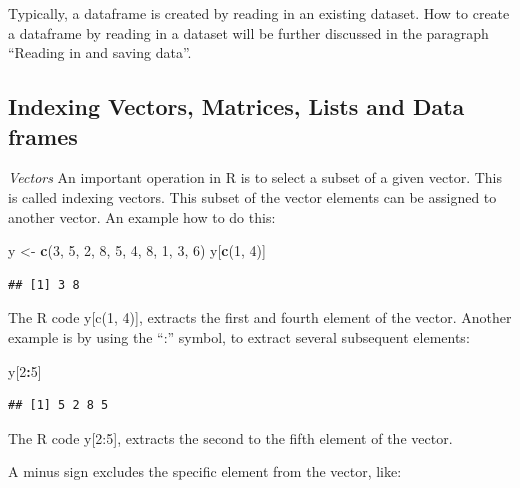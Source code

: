 \documentclass[]{book}
\newenvironment{Shaded}{\begin{snugshade}}{\end{snugshade}}
\newcommand{\KeywordTok}[1]{\textcolor[rgb]{0.13,0.29,0.53}{\textbf{#1}}}
\newcommand{\DecValTok}[1]{\textcolor[rgb]{0.00,0.00,0.81}{#1}}
\newcommand{\StringTok}[1]{\textcolor[rgb]{0.31,0.60,0.02}{#1}}
\newcommand{\OperatorTok}[1]{\textcolor[rgb]{0.81,0.36,0.00}{\textbf{#1}}}
\newcommand{\NormalTok}[1]{#1}
\theoremstyle{definition}
\theoremstyle{definition}
\theoremstyle{definition}
\theoremstyle{remark}
\begin{document}
Typically, a dataframe is created by reading in an existing dataset. How
to create a dataframe by reading in a dataset will be further discussed
in the paragraph ``Reading in and saving data''.

\subsection{Indexing Vectors, Matrices, Lists and Data
frames}\label{indexing-vectors-matrices-lists-and-data-frames}

\emph{Vectors} An important operation in R is to select a subset of a
given vector. This is called indexing vectors. This subset of the vector
elements can be assigned to another vector. An example how to do this:

\begin{Shaded}
\begin{Highlighting}[]
\NormalTok{y <-}\StringTok{ }\KeywordTok{c}\NormalTok{(}\DecValTok{3}\NormalTok{, }\DecValTok{5}\NormalTok{, }\DecValTok{2}\NormalTok{, }\DecValTok{8}\NormalTok{, }\DecValTok{5}\NormalTok{, }\DecValTok{4}\NormalTok{, }\DecValTok{8}\NormalTok{, }\DecValTok{1}\NormalTok{, }\DecValTok{3}\NormalTok{, }\DecValTok{6}\NormalTok{)}
\NormalTok{y[}\KeywordTok{c}\NormalTok{(}\DecValTok{1}\NormalTok{, }\DecValTok{4}\NormalTok{)]}
\end{Highlighting}
\end{Shaded}

\begin{verbatim}
## [1] 3 8
\end{verbatim}

The R code y{[}c(1, 4){]}, extracts the first and fourth element of the
vector. Another example is by using the ``:'' symbol, to extract several
subsequent elements:

\begin{Shaded}
\begin{Highlighting}[]
\NormalTok{y[}\DecValTok{2}\OperatorTok{:}\DecValTok{5}\NormalTok{]}
\end{Highlighting}
\end{Shaded}

\begin{verbatim}
## [1] 5 2 8 5
\end{verbatim}

The R code y{[}2:5{]}, extracts the second to the fifth element of the
vector.

A minus sign excludes the specific element from the vector, like:
\end{document}
